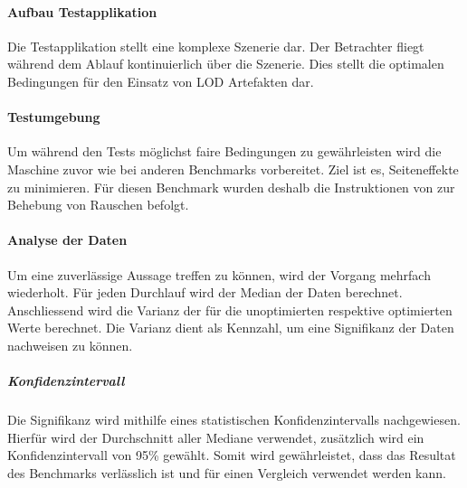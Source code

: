\paragraph{Aufbau Testapplikation}
Die Testapplikation stellt eine komplexe Szenerie dar. Der Betrachter fliegt während dem Ablauf kontinuierlich über die Szenerie. Dies stellt die optimalen Bedingungen für den Einsatz von LOD Artefakten dar.

\paragraph{Testumgebung}
Um während den Tests möglichst faire Bedingungen zu gewährleisten wird die Maschine zuvor wie bei anderen Benchmarks vorbereitet. Ziel ist es, Seiteneffekte zu minimieren. Für diesen Benchmark wurden deshalb die Instruktionen von  zur Behebung von Rauschen befolgt.
\cite{tracerBenchNoiseMitigation}

\paragraph{Analyse der Daten}
Um eine zuverlässige Aussage treffen zu können, wird der Vorgang mehrfach wiederholt. Für jeden Durchlauf wird der Median der  Daten berechnet.
Anschliessend wird die Varianz der  für die unoptimierten respektive optimierten Werte berechnet. Die Varianz dient als Kennzahl, um eine Signifikanz der Daten nachweisen zu können.

\subparagraph{Konfidenzintervall}
Die Signifikanz wird mithilfe eines statistischen Konfidenzintervalls nachgewiesen. Hierfür wird der Durchschnitt aller Mediane verwendet, zusätzlich wird ein Konfidenzintervall von 95\% gewählt. Somit wird gewährleistet, dass das Resultat des Benchmarks verlässlich ist und für einen Vergleich verwendet werden kann.
